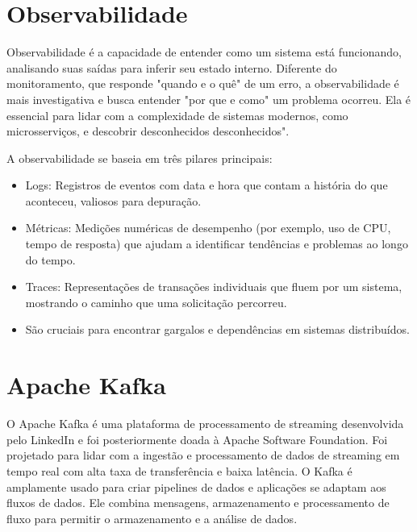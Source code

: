 \documentclass[12pt,a4paper]{article}
\begin{document}
\section{Observabilidade}

Observabilidade é a capacidade de entender como um sistema está funcionando, analisando suas saídas para inferir seu estado interno.
Diferente do monitoramento, que responde "quando e o quê" de um erro, a observabilidade é mais investigativa e busca entender "por que
e como" um problema ocorreu. Ela é essencial para lidar com a complexidade de sistemas modernos, como microsserviços, e descobrir
desconhecidos desconhecidos".

A observabilidade se baseia em três pilares principais:

\begin{itemize}
    \item Logs: Registros de eventos com data e hora que contam a história do que aconteceu, valiosos para depuração.
    \item Métricas: Medições numéricas de desempenho (por exemplo, uso de CPU, tempo de resposta) que ajudam a identificar tendências
e problemas ao longo do tempo.
    \item Traces: Representações de transações individuais que fluem por um sistema, mostrando o caminho que uma solicitação percorreu.
    \item São cruciais para encontrar gargalos e dependências em sistemas distribuídos.
\end{itemize}



\section{Apache Kafka}

O Apache Kafka é uma plataforma de processamento de streaming desenvolvida pelo LinkedIn e foi posteriormente doada à
Apache Software Foundation. Foi projetado para lidar com a ingestão e processamento de dados de streaming em tempo real
com alta taxa de transferência e baixa latência. O Kafka é amplamente usado para criar pipelines de dados e aplicações
se adaptam aos fluxos de dados. Ele combina mensagens, armazenamento e processamento de fluxo para permitir o armazenamento
e a análise de dados.
\end{document}
